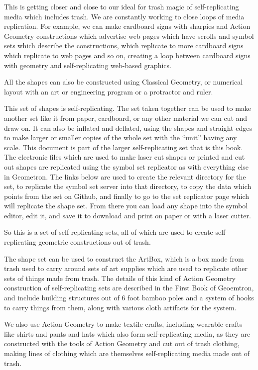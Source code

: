 This is getting closer and close to our ideal for trash magic of
self-replicating media which includes trash. We are constantly working
to close loops of media replication. For example, we can make cardboard
signs with sharpies and Action Geometry constructions which advertise
web pages which have scrolls and symbol sets which describe the
constructions, which replicate to more cardboard signs which replicate
to web pages and so on, creating a loop between cardboard signs with
geometry and self-replicating web-based graphics.

All the shapes can also be constructed using Classical Geometry, or
numerical layout with an art or engineering program or a protractor and
ruler.


This set of shapes is self-replicating. The set taken together can be
used to make another set like it from paper, cardboard, or any other
material we can cut and draw on. It can also be inflated and deflated,
using the shapes and straight edges to make larger or smaller copies of
the whole set with the ``unit'' having any scale. This document is part
of the larger self-replicating set that is this book. The electronic
files which are used to make laser cut shapes or printed and cut out
shapes are replicated using the symbol set replicator as with everything
else in Geometron. The links below are used to create the relevant
directory for the set, to replicate the symbol set server into that
directory, to copy the data which points from the set on Github, and
finally to go to the set replicator page which will replicate the shape
set. From there you can load any shape into the symbol editor, edit it,
and save it to download and print on paper or with a laser cutter.


So this is a set of self-replicating sets, all of which are used to
create self-replicating geometric constructions out of trash.

The shape set can be used to construct the ArtBox, which is a box made
from trash used to carry around sets of art supplies which are used to
replicate other sets of things made from trash. The details of this kind
of Action Geometry construction of self-replicating sets are described
in the First Book of Geoemtron, and include building structures out of 6
foot bamboo poles and a system of hooks to carry things from them, along
with various cloth artifacts for the system.

We also use Action Geometry to make textile crafts, including wearable
crafts like shirts and pants and hats which also form self-replicating
media, as they are constructed with the tools of Action Geometry and cut
out of trash clothing, making lines of clothing which are themselves
self-replicating media made out of trash.

